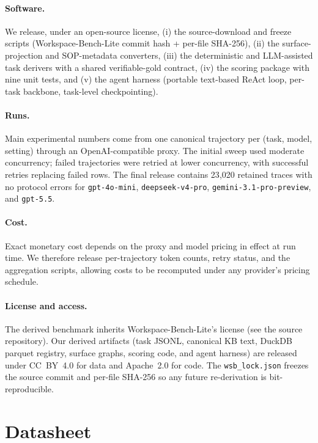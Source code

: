 \documentclass[11pt]{article}
\begin{document}
\paragraph{Software.}
We release, under an open-source license, (i) the source-download and
freeze scripts (Workspace-Bench-Lite commit hash + per-file SHA-256), (ii) the
surface-projection and SOP-metadata converters, (iii) the deterministic and LLM-assisted task
derivers with a shared verifiable-gold contract, (iv) the scoring package with
nine unit tests, and (v) the agent harness (portable text-based ReAct loop,
per-task backbone, task-level checkpointing).

\paragraph{Runs.}
Main experimental numbers come from one canonical trajectory per
(task, model, setting) through an OpenAI-compatible proxy. The initial sweep
used moderate concurrency; failed trajectories were retried at lower
concurrency, with successful retries replacing failed rows. The final release
contains 23{,}020 retained traces with no protocol errors for \texttt{gpt-4o-mini},
\texttt{deepseek-v4-pro}, \texttt{gemini-3.1-pro-preview}, and
\texttt{gpt-5.5}.

\paragraph{Cost.}
Exact monetary cost depends on the proxy and model pricing in effect at run
time. We therefore release per-trajectory token counts, retry status, and the
aggregation scripts, allowing costs to be recomputed under any provider's
pricing schedule.

\paragraph{License and access.}
The derived benchmark inherits Workspace-Bench-Lite's license (see the
source repository). Our derived artifacts (task JSONL, canonical KB text,
DuckDB parquet registry, surface graphs, scoring code, and agent harness) are
released under CC~BY~4.0 for data and Apache~2.0 for code. The
\texttt{wsb\_lock.json} freezes the source commit and per-file SHA-256 so any
future re-derivation is bit-reproducible.

\section{Datasheet}
\label{sec:datasheet}
\end{document}
